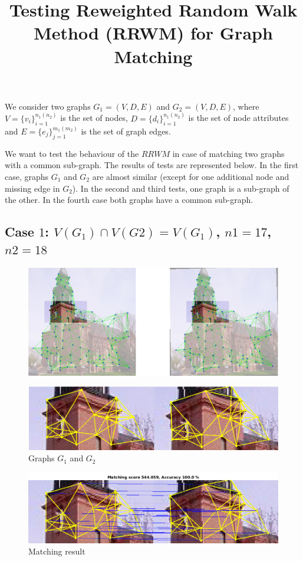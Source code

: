 \documentclass[
	fontsize=12pt,
	paper=a4,
	twoside=false,
	numbers=noenddot,
	plainheadsepline,
	toc=listof,
	toc=bibliography
]{scrartcl}
\title{Testing Reweighted Random Walk Method (RRWM) for Graph Matching }
\begin{document}
\maketitle

We consider two graphs $G_1=(V, D, E)$ and $G_2=(V, D, E)$, where $V = \{v_i\}_{i=1}^{n_1(n_2)}$ is the set of nodes, $D= \{d_i\}_{i=1}^{n_1(n_2)}$ is the set of node attributes and $E = \{e_{j}\}_{j=1}^{m_1(m_2)}$ is the set of graph edges.

We want to test the behaviour of the $RRWM$ in case of matching two graphs with a common sub-graph.
The results of tests are represented below.
In the first case, graphs $G_1$ and $G_2$ are almost similar (except for one additional node and missing edge in $G_2$). In the second and third tests, one graph is a sub-graph of the other. In the fourth case both graphs have a common sub-graph.

\newpage
\subsection*{ Case $1$: $V(G_1)\cap V(G2) = V(G_1)$, $n1=17$, $n2=18$}

\begin{figure} [htb] \centering
	\includegraphics[scale = 0.3]{test1/subregions.png}
\end{figure}
\begin{figure} [hb] \centering
	\includegraphics[scale = 0.4]{test1/subgraphs.png}
	\caption{Graphs $G_1$ and $G_2$}
\end{figure}
\begin{figure} [hb] \centering
	\includegraphics[scale = 0.4]{test1/matching_result.png}
	\caption{ Matching result}
\end{figure}
\end{document}
